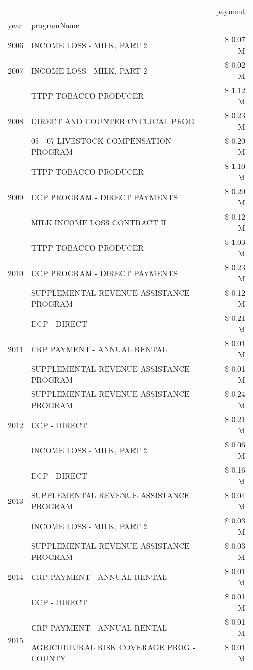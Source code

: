 \begin{tabular}{llr}
\toprule
 &  & payment \\
year & programName &  \\
\midrule
2006 & INCOME LOSS - MILK, PART 2 & \$ 0.07 M \\
\cline{1-3}
2007 & INCOME LOSS - MILK, PART 2 & \$ 0.02 M \\
\cline{1-3}
\multirow[t]{3}{*}{2008} & TTPP TOBACCO PRODUCER & \$ 1.12 M \\
 & DIRECT AND COUNTER CYCLICAL PROG & \$ 0.23 M \\
 & 05 - 07 LIVESTOCK COMPENSATION PROGRAM & \$ 0.20 M \\
\cline{1-3}
\multirow[t]{3}{*}{2009} & TTPP TOBACCO PRODUCER & \$ 1.10 M \\
 & DCP PROGRAM - DIRECT PAYMENTS & \$ 0.20 M \\
 & MILK INCOME LOSS CONTRACT II & \$ 0.12 M \\
\cline{1-3}
\multirow[t]{3}{*}{2010} & TTPP TOBACCO PRODUCER & \$ 1.03 M \\
 & DCP PROGRAM - DIRECT PAYMENTS & \$ 0.23 M \\
 & SUPPLEMENTAL REVENUE ASSISTANCE PROGRAM & \$ 0.12 M \\
\cline{1-3}
\multirow[t]{3}{*}{2011} & DCP - DIRECT & \$ 0.21 M \\
 & CRP PAYMENT - ANNUAL RENTAL & \$ 0.01 M \\
 & SUPPLEMENTAL REVENUE ASSISTANCE PROGRAM & \$ 0.01 M \\
\cline{1-3}
\multirow[t]{3}{*}{2012} & SUPPLEMENTAL REVENUE ASSISTANCE PROGRAM & \$ 0.24 M \\
 & DCP - DIRECT & \$ 0.21 M \\
 & INCOME LOSS - MILK, PART 2 & \$ 0.06 M \\
\cline{1-3}
\multirow[t]{3}{*}{2013} & DCP - DIRECT & \$ 0.16 M \\
 & SUPPLEMENTAL REVENUE ASSISTANCE PROGRAM & \$ 0.04 M \\
 & INCOME LOSS - MILK, PART 2 & \$ 0.03 M \\
\cline{1-3}
\multirow[t]{3}{*}{2014} & SUPPLEMENTAL REVENUE ASSISTANCE PROGRAM & \$ 0.03 M \\
 & CRP PAYMENT - ANNUAL RENTAL & \$ 0.01 M \\
 & DCP - DIRECT & \$ 0.01 M \\
\cline{1-3}
\multirow[t]{2}{*}{2015} & CRP PAYMENT - ANNUAL RENTAL & \$ 0.01 M \\
 & AGRICULTURAL RISK COVERAGE PROG - COUNTY & \$ 0.01 M \\

\end{tabular}
